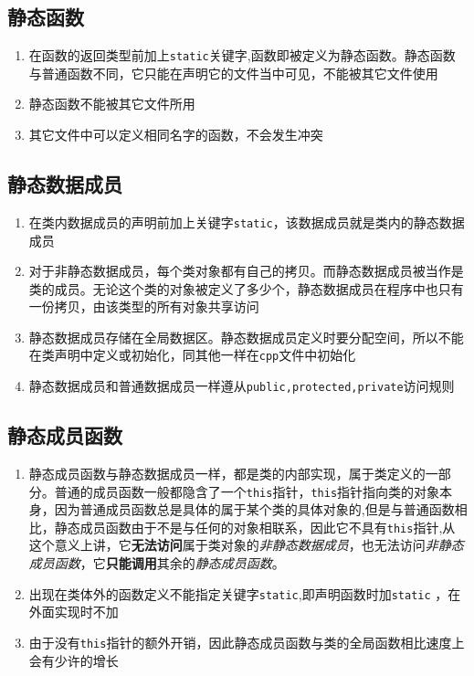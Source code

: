 \documentclass[UTF8,a4paper,12pt]{ctexbook} %
\begin{document}
	\subsection{静态函数}
		       \begin{enumerate}[fullwidth,itemindent=2em,label=(\arabic*)]
			       \item  在函数的返回类型前加上\verb|static|关键字,函数即被定义为静态函数。静态函数与普通函数不同，它只能在声明它的文件当中可见，不能被其它文件使用
		       
			       \item  静态函数不能被其它文件所用
		       
			       \item  其它文件中可以定义相同名字的函数，不会发生冲突
		       \end{enumerate}
	\subsection{静态数据成员}
		       \begin{enumerate}[fullwidth,itemindent=2em,label=(\arabic*)]
			       \item  在类内数据成员的声明前加上关键字\verb|static|，该数据成员就是类内的静态数据成员
			       
			       \item  对于非静态数据成员，每个类对象都有自己的拷贝。而静态数据成员被当作是类的成员。无论这个类的对象被定义了多少个，静态数据成员在程序中也只有一份拷贝，由该类型的所有对象共享访问
			       
			       \item  静态数据成员存储在全局数据区。静态数据成员定义时要分配空间，所以不能在类声明中定义或初始化，同其他一样在\verb|cpp|文件中初始化
			       
			       \item  静态数据成员和普通数据成员一样遵从\verb|public,protected,private|访问规则
		       \end{enumerate}
		       
	\subsection{静态成员函数}
		       \begin{enumerate}[fullwidth,itemindent=2em,label=(\arabic*)]
			       \item  静态成员函数与静态数据成员一样，都是类的内部实现，属于类定义的一部分。普通的成员函数一般都隐含了一个\verb|this|指针，\verb|this|指针指向类的对象本身，因为普通成员函数总是具体的属于某个类的具体对象的,但是与普通函数相比，静态成员函数由于不是与任何的对象相联系，因此它不具有\verb|this|指针,从这个意义上讲，它\textbf{无法访问}属于类对象的\textit{非静态数据成员}，也无法访问\textit{非静态成员函数}，它\textbf{只能调用}其余的\textit{静态成员函数}。
			       
			       \item  出现在类体外的函数定义不能指定关键字\verb|static|,即声明函数时加\verb|static| ，在外面实现时不加
			       
			       \item  由于没有\verb|this|指针的额外开销，因此静态成员函数与类的全局函数相比速度上会有少许的增长
		       \end{enumerate}
\end{document}
